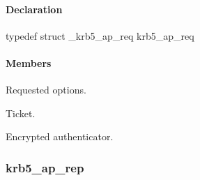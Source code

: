 \documentclass[letterpaper,10pt,english]{sphinxmanual}
\begin{document}
\paragraph{Declaration}
\label{appdev/refs/types/krb5_ap_req:declaration}
typedef struct \_krb5\_ap\_req  krb5\_ap\_req


\paragraph{Members}
\label{appdev/refs/types/krb5_ap_req:members}

\begin{fulllineitems}
\label{appdev/refs/types/krb5_ap_req:c.krb5_ap_req.magic}
\end{fulllineitems}


\begin{fulllineitems}
\label{appdev/refs/types/krb5_ap_req:c.krb5_ap_req.ap_options}
Requested options.

\end{fulllineitems}


\begin{fulllineitems}
\label{appdev/refs/types/krb5_ap_req:c.krb5_ap_req.ticket}
Ticket.

\end{fulllineitems}


\begin{fulllineitems}
\label{appdev/refs/types/krb5_ap_req:c.krb5_ap_req.authenticator}
Encrypted authenticator.

\end{fulllineitems}



\subsubsection{krb5\_ap\_rep}
\label{appdev/refs/types/krb5_ap_rep:krb5-ap-rep-struct}\label{appdev/refs/types/krb5_ap_rep:krb5-ap-rep}\label{appdev/refs/types/krb5_ap_rep::doc}
\end{document}

